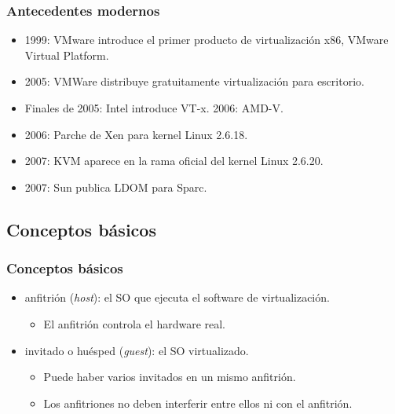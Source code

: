 \documentclass{beamer}
\begin{document}

\begin{frame}
\frametitle{Antecedentes modernos}

\begin{itemize}
\item \alert{1999}: VMware introduce el primer producto de virtualización x86, VMware Virtual Platform.
\item \alert{2005}: VMWare distribuye gratuitamente virtualización para escritorio.
\item \alert{Finales de 2005}: Intel introduce VT-x. \alert{2006}: AMD-V.
\item \alert{2006}: Parche de Xen para kernel Linux 2.6.18.
\item \alert{2007}: KVM aparece en la rama oficial del kernel Linux 2.6.20.
\item \alert{2007}: Sun publica LDOM para Sparc. 
\end{itemize}

\end{frame}


\subsection{Conceptos básicos}



\begin{frame}
\frametitle{Conceptos básicos}

\begin{itemize}
\item \alert{anfitrión} (\textit{host}): el SO que ejecuta el software de virtualización.
	\begin{itemize}
	\item El anfitrión controla el hardware real.
	\end{itemize}
\item \alert{invitado} o \alert{huésped} (\textit{guest}): el SO virtualizado.
	\begin{itemize}
	\item Puede haber varios invitados en un mismo anfitrión. 
	\item Los anfitriones no deben interferir entre ellos ni con el anfitrión.
	\end{itemize}
\end{itemize}

\end{frame}
\end{document}
